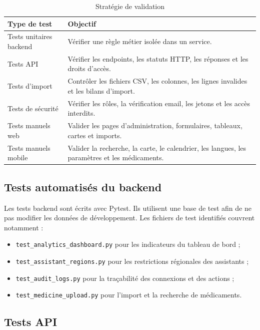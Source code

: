 \begin{table}[H]
    \centering
    \caption{Stratégie de validation}
    \begin{tabular}{L{4cm}L{9cm}}
        \toprule
        \textbf{Type de test} & \textbf{Objectif} \\
        \midrule
        Tests unitaires backend & Vérifier une règle métier isolée dans un service. \\
        Tests API & Vérifier les endpoints, les statuts HTTP, les réponses et les droits d'accès. \\
        Tests d'import & Contrôler les fichiers CSV, les colonnes, les lignes invalides et les bilans d'import. \\
        Tests de sécurité & Vérifier les rôles, la vérification email, les jetons et les accès interdits. \\
        Tests manuels web & Valider les pages d'administration, formulaires, tableaux, cartes et imports. \\
        Tests manuels mobile & Valider la recherche, la carte, le calendrier, les langues, les paramètres et les médicaments. \\
        \bottomrule
    \end{tabular}
\end{table}

\subsection{Tests automatisés du backend}

Les tests backend sont écrits avec Pytest. Ils utilisent une base de test afin de ne pas modifier les données
de développement. Les fichiers de test identifiés couvrent notamment :

\begin{itemize}
    \item \texttt{test\_analytics\_dashboard.py} pour les indicateurs du tableau de bord ;
    \item \texttt{test\_assistant\_regions.py} pour les restrictions régionales des assistants ;
    \item \texttt{test\_audit\_logs.py} pour la traçabilité des connexions et des actions ;
    \item \texttt{test\_medicine\_upload.py} pour l'import et la recherche de médicaments.
\end{itemize}

\subsection{Tests API}

